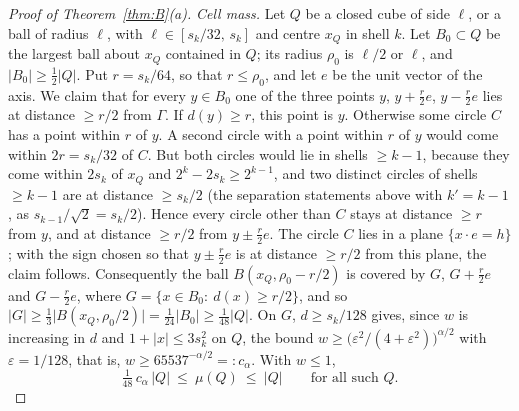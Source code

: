 \documentclass[11pt]{amsart}
\newcommand{\abs}[1]{\lvert #1\rvert}
\theoremstyle{plain}
\theoremstyle{definition}
\theoremstyle{remark}
\begin{document}
\begin{proof}[Proof of Theorem~\ref{thm:B}(a)]
\emph{Cell mass.} Let $Q$ be a closed cube of side $\ell$, or a ball of radius
$\ell$, with $\ell\in[s_k/32,\,s_k]$ and centre $x_Q$ in shell $k$. Let
$B_0\subset Q$ be the largest ball about $x_Q$ contained in $Q$; its radius
$\rho_0$ is $\ell/2$ or $\ell$, and $\abs{B_0}\ge\tfrac12\abs Q$. Put $r=s_k/64$,
so that $r\le\rho_0$, and let $e$ be the unit vector of the axis. We claim that
for every $y\in B_0$ one of the three points $y$, $y+\tfrac r2e$, $y-\tfrac r2e$
lies at distance $\ge r/2$ from $\Gamma$. If $d(y)\ge r$, this point is $y$.
Otherwise some circle $C$ has a point within $r$ of $y$. A second circle with
a point within $r$ of $y$ would come within $2r=s_k/32$ of $C$. But both
circles would lie in shells $\ge k-1$, because they come within $2s_k$ of
$x_Q$ and $2^k-2s_k\ge2^{k-1}$, and two distinct circles of shells $\ge k-1$
are at distance $\ge s_k/2$ (the separation statements above with $k'=k-1$, as
$s_{k-1}/\sqrt2=s_k/2$). Hence every circle other than $C$ stays at distance
$\ge r$ from $y$, and at distance $\ge r/2$ from $y\pm\tfrac r2e$. The circle
$C$ lies in a plane $\{x\cdot e=h\}$; with the sign chosen so that
$y\pm\tfrac r2e$ is at distance $\ge r/2$ from this plane, the claim follows.
Consequently the ball $B(x_Q,\rho_0-r/2)$ is covered by $G$, $G+\tfrac r2e$ and
$G-\tfrac r2e$, where $G=\{x\in B_0:\ d(x)\ge r/2\}$, and so
$\abs G\ge\tfrac13\abs{B(x_Q,\rho_0/2)}=\tfrac1{24}\abs{B_0}\ge\tfrac1{48}\abs Q$.
On $G$, $d\ge s_k/128$ gives, since $w$ is increasing in $d$ and
$1+\abs x\le3s_k^2$ on $Q$, the bound
$w\ge\bigl(\varepsilon^2/(4+\varepsilon^2)\bigr)^{\alpha/2}$ with
$\varepsilon=1/128$, that is, $w\ge65537^{-\alpha/2}=:c_\alpha$. With $w\le1$,
\begin{equation}\label{eq:cellmass}
\tfrac1{48}\,c_\alpha\,\abs Q\ \le\ \mu(Q)\ \le\ \abs Q
\qquad\text{for all such }Q.
\end{equation}


\end{proof}
\end{document}
